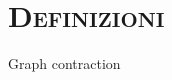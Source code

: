 \documentclass[xcolor=x11names,compress]{beamer}
\begin{document}
\section{\scshape Definizioni}
{
\begin{frame}[t]{Graph contraction}
    \vspace*{-0.65cm}
    \begin{minipage}[t]{\textwidth}
        
        \hfill
        
    \end{minipage}
\end{frame}}
\end{document}

